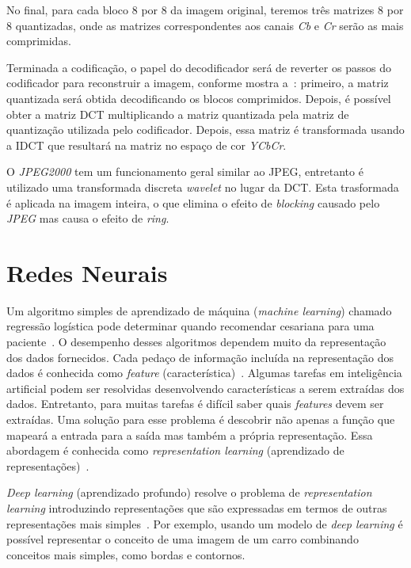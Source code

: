 No final, para cada bloco 8 por 8 da imagem original, teremos três matrizes 8 por 8 quantizadas, onde as matrizes correspondentes aos canais \textit{Cb} e \textit{Cr} serão as mais comprimidas.

Terminada a codificação, o papel do decodificador será de reverter os passos do codificador para reconstruir a imagem, conforme mostra a~: primeiro, a matriz quantizada será obtida decodificando os blocos comprimidos. Depois, é possível obter a matriz \acrshort{DCT} multiplicando a matriz quantizada pela matriz de quantização utilizada pelo codificador. Depois, essa matriz é transformada usando a \acrshort{IDCT} que resultará na matriz no espaço de cor \textit{YCbCr}.

O \textit{JPEG2000} tem um funcionamento geral similar ao JPEG, entretanto é utilizado uma transformada discreta \textit{wavelet} no lugar da \acrshort{DCT}. Esta trasformada é aplicada na imagem inteira, o que elimina o efeito de \textit{blocking} causado pelo \textit{JPEG} mas causa o efeito de \textit{ring}.
\section{Redes Neurais}
Um algoritmo simples de aprendizado de máquina (\textit{machine learning}) chamado regressão logística pode determinar quando recomendar cesariana para uma paciente~\cite{mor1990ranking}. O desempenho desses algoritmos dependem muito da representação dos dados fornecidos. Cada pedaço de informação incluída na representação dos dados é conhecida como \textit{feature} (característica)~\cite{deeplearning}. Algumas tarefas em inteligência artificial podem ser resolvidas desenvolvendo características a serem extraídas dos dados. Entretanto, para muitas tarefas é difícil saber quais \textit{features} devem ser extraídas. Uma solução para esse problema é descobrir não apenas a função que mapeará a entrada para a saída mas também a própria representação. Essa abordagem é conhecida como \textit{representation learning} (aprendizado de representações)~\cite{deeplearning}.

\textit{Deep learning} (aprendizado profundo) resolve o problema de \textit{representation learning} introduzindo representações que são expressadas em termos de outras representações mais simples~\cite{deeplearning}. Por exemplo, usando um modelo de \textit{deep learning} é possível representar o conceito de uma imagem de um carro combinando conceitos mais simples, como bordas e contornos.


